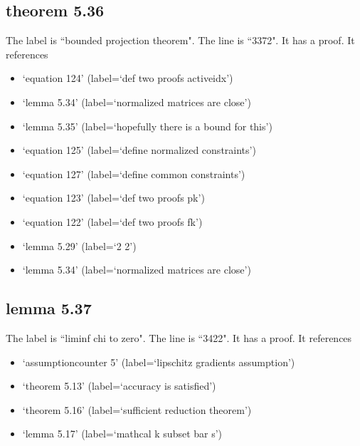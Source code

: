 \documentclass{article}
\begin{document}
\subsection{theorem 5.36}
The label is ``bounded projection theorem".
The line is ``3372".
It has a proof.
It references \begin{itemize}
\item `equation 124' (label=`def two proofs activeidx')
\item `lemma 5.34' (label=`normalized matrices are close')
\item `lemma 5.35' (label=`hopefully there is a bound for this')
\item `equation 125' (label=`define normalized constraints')
\item `equation 127' (label=`define common constraints')
\item `equation 123' (label=`def two proofs pk')
\item `equation 122' (label=`def two proofs fk')
\item `lemma 5.29' (label=`2 2')
\item `lemma 5.34' (label=`normalized matrices are close')
\end{itemize}
\subsection{lemma 5.37}
The label is ``liminf chi to zero".
The line is ``3422".
It has a proof.
It references \begin{itemize}
\item `assumptioncounter 5' (label=`lipschitz gradients assumption')
\item `theorem 5.13' (label=`accuracy is satisfied')
\item `theorem 5.16' (label=`sufficient reduction theorem')
\item `lemma 5.17' (label=`mathcal k subset bar s')
\end{itemize}
\end{document}
